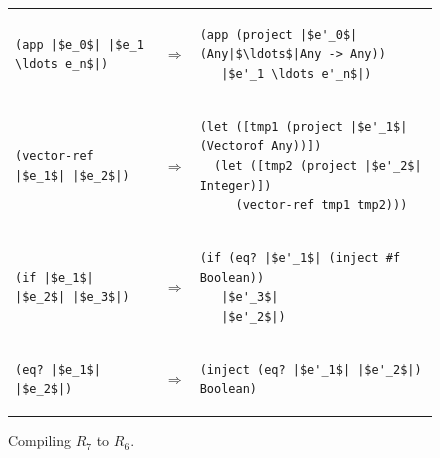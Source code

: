 \documentclass[11pt]{book}
\begin{document}
\begin{figure}[btp]
\begin{tabular}{|lll|}
\begin{minipage}{0.6\textwidth}
\end{minipage}
\\[2ex]\hline
\begin{minipage}{0.25\textwidth}
\begin{lstlisting}
(app |$e_0$| |$e_1 \ldots e_n$|)
\end{lstlisting}
\end{minipage}
&
$\Rightarrow$
&
\begin{minipage}{0.6\textwidth}
\begin{lstlisting}
(app (project |$e'_0$| (Any|$\ldots$|Any -> Any))
   |$e'_1 \ldots e'_n$|)
\end{lstlisting}
\end{minipage}
\\[2ex]\hline
\begin{minipage}{0.25\textwidth}
\begin{lstlisting}
(vector-ref |$e_1$| |$e_2$|)
\end{lstlisting}
\end{minipage}
&
$\Rightarrow$
&
\begin{minipage}{0.6\textwidth}
\begin{lstlisting}
(let ([tmp1 (project |$e'_1$| (Vectorof Any))])
  (let ([tmp2 (project |$e'_2$| Integer)])
     (vector-ref tmp1 tmp2)))
\end{lstlisting}
\end{minipage}
\\[2ex]\hline
\begin{minipage}{0.25\textwidth}
\begin{lstlisting}
(if |$e_1$| |$e_2$| |$e_3$|)
\end{lstlisting}
\end{minipage}
&
$\Rightarrow$
&
\begin{minipage}{0.6\textwidth}
\begin{lstlisting}
(if (eq? |$e'_1$| (inject #f Boolean))
   |$e'_3$|
   |$e'_2$|)
\end{lstlisting}
\end{minipage}
\\[2ex]\hline
\begin{minipage}{0.25\textwidth}
\begin{lstlisting}
(eq? |$e_1$| |$e_2$|)
\end{lstlisting}
\end{minipage}
&
$\Rightarrow$
&
\begin{minipage}{0.6\textwidth}
\begin{lstlisting}
(inject (eq? |$e'_1$| |$e'_2$|) Boolean)
\end{lstlisting}
\end{minipage}
\\[2ex]\hline
\end{tabular} 

\caption{Compiling $R_7$ to $R_6$.}
\label{fig:compile-r7-r6}
\end{figure}
\end{document}
